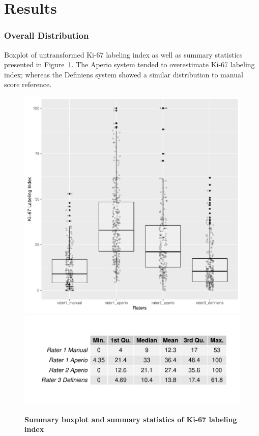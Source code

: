 \documentclass[final,5p,times,twocolumn]{elsarticle}
\begin{document}
\section*{Results}

\subsubsection*{Overall Distribution}
Boxplot of untransformed Ki-67 labeling index as well as summary statistics presented in Figure~\ref{boxplot}. The Aperio system tended to overestimate Ki-67 labeling index; whereas the Definiens system showed a similar distribution to manual score reference.

\begin{figure}
\includegraphics[width = \linewidth]{boxplot}
\includegraphics[width = \linewidth]{boxStat}

\centering
\caption{{\bf Summary boxplot and summary statistics of Ki-67 labeling index}}
\label{boxplot}
\end{figure}
\end{document}
